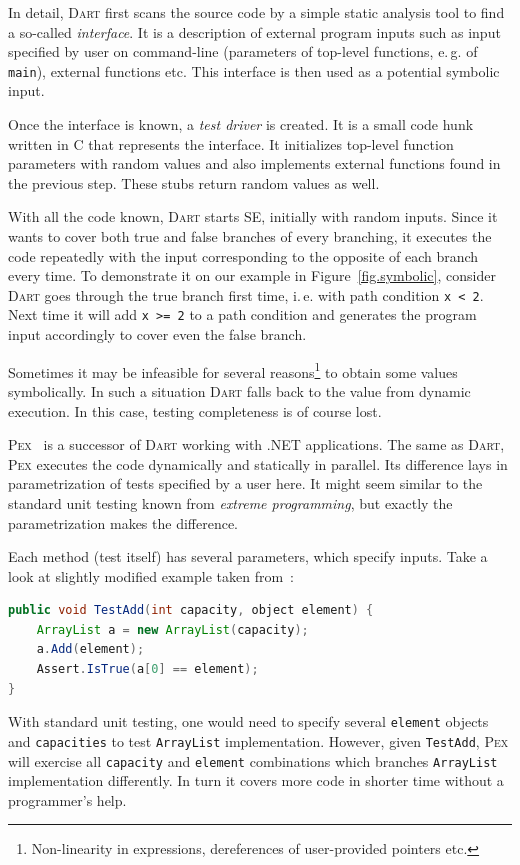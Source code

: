 \documentclass[11pt,a4paper]{article}
\begin{document}
In detail, \textsc{Dart} first scans the source code by a simple static
analysis tool to find a so-called \emph{interface}. It is a description of
external program inputs such as input specified by user on command-line
(parameters of top-level functions, e.\,g. of \texttt{main}), external
functions etc. This interface is then used as a potential symbolic input.

Once the interface is known, a \emph{test driver} is created. It is a small
code hunk written in C that represents the interface. It initializes
top-level function parameters with random values and also implements external
functions found in the previous step. These stubs return random values as
well.

With all the code known, \textsc{Dart} starts SE, initially with random
inputs. Since it wants to cover both true and false branches of every
branching, it executes the code repeatedly with the input corresponding to the
opposite of each branch every time. To demonstrate it on our example in
Figure~\ref{fig.symbolic}, consider \textsc{Dart} goes through the true branch
first time, i.\,e. with path condition \texttt{x < 2}. Next time it will add
\texttt{x >= 2} to a path condition and generates the program input
accordingly to cover even the false branch.

Sometimes it may be infeasible for several reasons\footnote{Non-linearity in
expressions, dereferences of user-provided pointers etc.} to obtain some values
symbolically. In such a situation \textsc{Dart} falls back to the value from
dynamic execution. In this case, testing completeness is of course lost.

\textsc{Pex}~\cite{pex} is a successor of \textsc{Dart} working with .NET
applications. The same as \textsc{Dart}, \textsc{Pex} executes the code
dynamically and statically in parallel. Its difference lays in parametrization
of tests specified by a user here. It might seem similar to the standard unit
testing known from \emph{extreme programming}, but exactly the parametrization
makes the difference.

Each method (test itself) has several parameters, which specify inputs. Take
a look at slightly modified example taken from~\cite{pex}:
\begin{lstlisting}[language=Java]
public void TestAdd(int capacity, object element) {
	ArrayList a = new ArrayList(capacity);
	a.Add(element);
	Assert.IsTrue(a[0] == element);
}
\end{lstlisting}
With standard unit testing, one would need to specify several \texttt{element}
objects and \texttt{capacities} to test \texttt{ArrayList} implementation.
However, given \texttt{TestAdd}, \textsc{Pex} will exercise all
\texttt{capacity} and \texttt{element} combinations which branches
\texttt{ArrayList} implementation differently. In turn it covers more code in
shorter time without a programmer's help.
\end{document}
